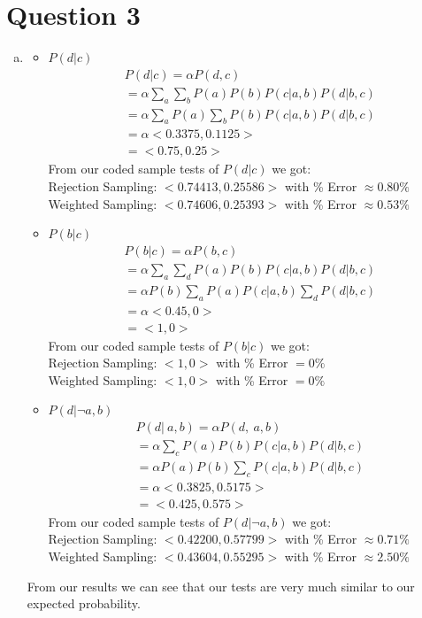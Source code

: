 \documentclass{article}
\begin{document}
\section*{Question 3}
\begin{enumerate}[a)]
    \item
    \begin{itemize}
        \item $P(d|c)$
            \begin{gather*}
               P(d|c) = \alpha P(d, c) \\
               = \alpha \sum_{a} \sum_{b} P(a)P(b)P(c|a, b)P(d|b,c)\\
               = \alpha \sum_{a} P(a) \sum_{b} P(b)P(c|a, b)P(d|b,c) \\
               = \alpha <0.3375, 0.1125> \\ = <0.75, 0.25>
            \end{gather*}
        From our coded sample tests of $P(d|c)$ we got: \\
        Rejection Sampling: $<0.74413, 0.25586>$ with \% Error $\approx 0.80\%$ \\
        Weighted Sampling: $<0.74606, 0.25393>$ with \% Error $\approx 0.53\%$
        \item $P(b|c)$
            \begin{gather*}
               P(b|c) = \alpha P(b, c) \\
               = \alpha \sum_{a} \sum_{d} P(a)P(b)P(c|a, b)P(d|b,c)\\
               = \alpha  P(b) \sum_{a} P(a) P(c|a, b) \sum_{d} P(d|b,c) \\
               = \alpha <0.45, 0> \\ = <1, 0>
            \end{gather*}
        From our coded sample tests of $P(b|c)$ we got: \\
        Rejection Sampling: $<1, 0>$ with \% Error $= 0\%$\\
        Weighted Sampling: $<1, 0>$ with \% Error $= 0\%$
        \item $P(d|\neg a, b)$
            \begin{gather*}
               P(d|~a, b) = \alpha P(d, ~a, b) \\
               = \alpha  \sum_{c} P(a)P(b)P(c|a, b)P(d|b,c)\\
               = \alpha P(a)P(b) \sum_{c} P(c|a, b)P(d|b,c)\\
               = \alpha <0.3825, 0.5175> \\ = <0.425, 0.575>
            \end{gather*}
        From our coded sample tests of $P(d|\neg a, b)$ we got: \\
        Rejection Sampling: $<0.42200, 0.57799>$ with \% Error $\approx 0.71\%$ \\
        Weighted Sampling: $<0.43604, 0.55295>$ with \% Error $\approx 2.50\%$
    \end{itemize}
    From our results we can see that our tests are very much similar to our expected probability.
    

\end{enumerate}
\end{document}
